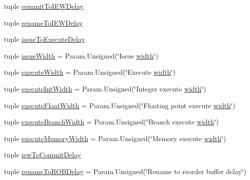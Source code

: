\begin{DoxyCompactItemize}
\item 
tuple \hyperlink{classSimpleOzoneCPU_1_1SimpleOzoneCPU_afc77f4f67ebd047a4af56403975f4464}{commitToIEWDelay}
\item 
tuple \hyperlink{classSimpleOzoneCPU_1_1SimpleOzoneCPU_acdec10386abd09a4724775d533fc65d4}{renameToIEWDelay}
\item 
tuple \hyperlink{classSimpleOzoneCPU_1_1SimpleOzoneCPU_ab445ea6366a58d7753b058bd794548a8}{issueToExecuteDelay}
\item 
tuple \hyperlink{classSimpleOzoneCPU_1_1SimpleOzoneCPU_a1e02adcb8a1e64fc82f4b389844d2f68}{issueWidth} = Param.Unsigned(\char`\"{}Issue \hyperlink{classSimpleOzoneCPU_1_1SimpleOzoneCPU_a397bb3beea7b21f074bc75e1e71f132f}{width}\char`\"{})
\item 
tuple \hyperlink{classSimpleOzoneCPU_1_1SimpleOzoneCPU_a5257b644f11c5f2c70417ef15932fb77}{executeWidth} = Param.Unsigned(\char`\"{}Execute \hyperlink{classSimpleOzoneCPU_1_1SimpleOzoneCPU_a397bb3beea7b21f074bc75e1e71f132f}{width}\char`\"{})
\item 
tuple \hyperlink{classSimpleOzoneCPU_1_1SimpleOzoneCPU_a0231660f86020f1dddc6d827aed5a711}{executeIntWidth} = Param.Unsigned(\char`\"{}Integer execute \hyperlink{classSimpleOzoneCPU_1_1SimpleOzoneCPU_a397bb3beea7b21f074bc75e1e71f132f}{width}\char`\"{})
\item 
tuple \hyperlink{classSimpleOzoneCPU_1_1SimpleOzoneCPU_a29617aaf82ccd8820fe66dd71d954fee}{executeFloatWidth} = Param.Unsigned(\char`\"{}Floating point execute \hyperlink{classSimpleOzoneCPU_1_1SimpleOzoneCPU_a397bb3beea7b21f074bc75e1e71f132f}{width}\char`\"{})
\item 
tuple \hyperlink{classSimpleOzoneCPU_1_1SimpleOzoneCPU_a85784e938a57b92cd9d1eeaaca8500b1}{executeBranchWidth} = Param.Unsigned(\char`\"{}Branch execute \hyperlink{classSimpleOzoneCPU_1_1SimpleOzoneCPU_a397bb3beea7b21f074bc75e1e71f132f}{width}\char`\"{})
\item 
tuple \hyperlink{classSimpleOzoneCPU_1_1SimpleOzoneCPU_a4251b67a387181c64371cc3f1bed89e7}{executeMemoryWidth} = Param.Unsigned(\char`\"{}Memory execute \hyperlink{classSimpleOzoneCPU_1_1SimpleOzoneCPU_a397bb3beea7b21f074bc75e1e71f132f}{width}\char`\"{})
\item 
tuple \hyperlink{classSimpleOzoneCPU_1_1SimpleOzoneCPU_a724a185702137da4a74c263b1ea63fec}{iewToCommitDelay}
\item 
tuple \hyperlink{classSimpleOzoneCPU_1_1SimpleOzoneCPU_a1c17c9a7d634b03c7c2b7c0ba0ca21b9}{renameToROBDelay} = Param.Unsigned(\char`\"{}Rename to reorder buffer delay\char`\"{})

\end{DoxyCompactItemize}
